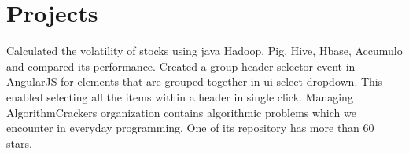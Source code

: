   \resumeSubHeadingListEnd


\section{Projects}
  \resumeSubHeadingListStart
      {Calculated the volatility of stocks using java Hadoop, Pig, Hive, Hbase, Accumulo and compared its performance.}
      {Created a group header selector event in AngularJS for elements that are grouped together in ui-select dropdown. This enabled selecting all the items within a header in single click.}
      {Managing AlgorithmCrackers organization contains algorithmic problems which we encounter in everyday programming. One of its repository has more than 60 stars. }
  \resumeSubHeadingListEnd
  
%



